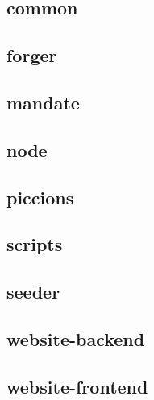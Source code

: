 \documentclass[../documentation.tex]{subfiles}
\begin{document}
\subsection{common}


\subsection{forger}


\subsection{mandate}


\subsection{node}


\subsection{piccions}


\subsection{scripts}


\subsection{seeder}


\subsection{website-backend}


\subsection{website-frontend}

\end{document}
